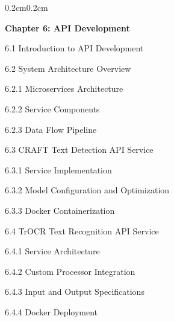 {\begin{adjustwidth}{0.2cm}{0.2cm}
    \vspace{0.5cm}
    { \textbf{Chapter 6: API Development}\dotfill\pageref{ch:development}\par}
    { \hspace{0.5cm} 6.1 Introduction to API Development\dotfill\pageref{sec:api-introduction}\par}
    { \hspace{0.5cm} 6.2 System Architecture Overview\dotfill\pageref{sec:system-architecture}\par}
    { \hspace{1cm} 6.2.1 Microservices Architecture\dotfill\pageref{subsec:microservices}\par}
    { \hspace{1cm} 6.2.2 Service Components\dotfill\pageref{subsec:service-components}\par}
    { \hspace{1cm} 6.2.3 Data Flow Pipeline\dotfill\pageref{subsec:data-flow}\par}
    { \hspace{0.5cm} 6.3 CRAFT Text Detection API Service\dotfill\pageref{sec:craft-api}\par}
    { \hspace{1cm} 6.3.1 Service Implementation\dotfill\pageref{subsec:craft-implementation}\par}
    { \hspace{1cm} 6.3.2 Model Configuration and Optimization\dotfill\pageref{subsec:craft-config}\par}
    { \hspace{1cm} 6.3.3 Docker Containerization\dotfill\pageref{subsec:craft-docker}\par}
    { \hspace{0.5cm} 6.4 TrOCR Text Recognition API Service\dotfill\pageref{sec:trocr-api}\par}
    { \hspace{1cm} 6.4.1 Service Architecture\dotfill\pageref{subsec:trocr-architecture}\par}
    { \hspace{1cm} 6.4.2 Custom Processor Integration\dotfill\pageref{subsec:custom-processor}\par}
    { \hspace{1cm} 6.4.3 Input and Output Specifications\dotfill\pageref{subsec:trocr-io}\par}
    { \hspace{1cm} 6.4.4 Docker Deployment\dotfill\pageref{subsec:trocr-docker}\par}

\end{adjustwidth}}
